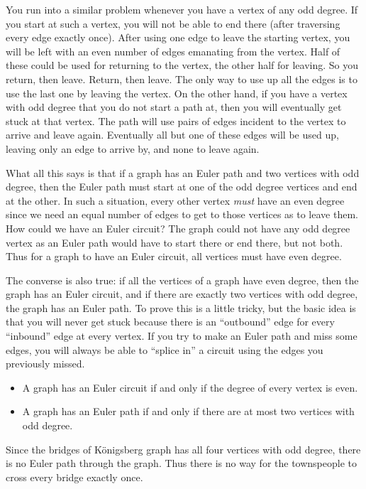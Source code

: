 \documentclass[10pt,]{book}
\theoremstyle{plain}
\theoremstyle{definition}
\theoremstyle{definition}
\theoremstyle{definition}
\theoremstyle{definition}
\numberwithin{equation}{chapter}
\begin{document}
You run into a similar problem whenever you have a vertex of any odd degree. If you start at such a vertex, you will not be able to end there (after traversing every edge exactly once). After using one edge to leave the starting vertex, you will be left with an even number of edges emanating from the vertex. Half of these could be used for returning to the vertex, the other half for leaving. So you return, then leave. Return, then leave. The only way to use up all the edges is to use the last one by leaving the vertex. On the other hand, if you have a vertex with odd degree that you do not start a path at, then you will eventually get stuck at that vertex. The path will use pairs of edges incident to the vertex to arrive and leave again. Eventually all but one of these edges will be used up, leaving only an edge to arrive by, and none to leave again.%
\par
\hypertarget{p-147}{}%
What all this says is that if a graph has an Euler path and two vertices with odd degree, then the Euler path must start at one of the odd degree vertices and end at the other. In such a situation, every other vertex \emph{must} have an even degree since we need an equal number of edges to get to those vertices as to leave them. How could we have an Euler circuit? The graph could not have any odd degree vertex as an Euler path would have to start there or end there, but not both. Thus for a graph to have an Euler circuit, all vertices must have even degree.%
\par
\hypertarget{p-148}{}%
The converse is also true: if all the vertices of a graph have even degree, then the graph has an Euler circuit, and if there are exactly two vertices with odd degree, the graph has an Euler path. To prove this is a little tricky, but the basic idea is that you will never get stuck because there is an ``outbound'' edge for every ``inbound'' edge at every vertex. If you try to make an Euler path and miss some edges, you will always be able to ``splice in'' a circuit using the edges you previously missed.%
\begin{assemblage}\label{assemblage-4}
\hypertarget{p-149}{}%
%
\begin{itemize}[label=\textbullet]
\item{}\hypertarget{p-150}{}%
A graph has an Euler circuit if and only if the degree of every vertex is even.%
\item{}\hypertarget{p-151}{}%
A graph has an Euler path if and only if there are at most two vertices with odd degree.%
\end{itemize}
%
\end{assemblage}
\hypertarget{p-152}{}%
Since the bridges of Königsberg graph has all four vertices with odd degree, there is no Euler path through the graph.  Thus there is no way for the townspeople to cross every bridge exactly once.%
\typeout{************************************************}
\typeout{************************************************}
\end{document}
